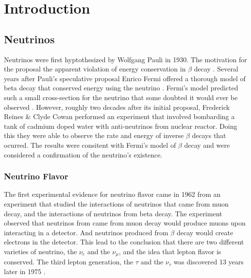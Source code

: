 
\chapter{Introduction}

\ifpdf
    \graphicspath{{introduction/figures/PNG/}{introduction/figures/PDF/}{introduction/figures/}}
\else
    \graphicspath{{introduction/figures/EPS/}{introduction/figures/}}
\fi


\section{Neutrinos}
Neutrinos were first hyptothesized by Wolfgang Pauli in 1930.
The motivation for the proposal the apparent violation of energy
conservation in $\beta$ decay \citep{pauli_letter}.
Several years after Pauli's speculative proposal Enrico Fermi offered
a thorough model of beta decay that conserved energy using the neutrino
\citep{fermi_beta_decay}.
Fermi's model predicted such a small cross-section for the neutrino that some
doubted it would ever be observed \citep{bethe_impossible_to_observe}.
However, roughly two decades after its initial proposal, Frederick Reines \&
Clyde Cowan performed an experiment that involved bombarding a tank of cadmium
doped water with anti-neutrinos from nuclear reactor.
Doing this they were able to observe the rate and energy of inverse $\beta$
decays that ocurred.
The results were consitent with Fermi's model of $\beta$ decay and were
considered a confirmation of the neutrino's existence.

\subsection{Neutrino Flavor}
The first experimental evidence for neutrino flavor came in 1962 from an
experiment \citep{lederman_muon_flavor} that studied the interactions of
neutrinos that came from muon decay, and the interactions of neutrinos
from beta decay.
The experiment observed that neutrinos from came from muon decay would produce
muons upon interacting in a detector.
And neutrinos produced from $\beta$ decay would create electrons in the
detector.
This lead to the conclusion that there are two different varieties of neutrino,
the $\nu_e$ and the $\nu_{\mu}$, and the idea that lepton flavor is conserved.
The third lepton generation, the $\tau$ and the $\nu_{\tau}$ was discovered 13
years later in 1975 \citep{tau_discovery}.


